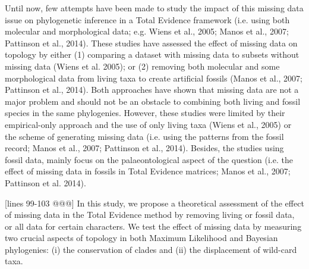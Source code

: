 \documentclass[12pt,letterpaper]{article}
\begin{document}
\begin{enumerate}
Until now, few attempts have been made to study the impact of this missing data issue on phylogenetic inference in a Total Evidence framework (i.e. using both molecular and morphological data; e.g. Wiens et al., 2005; Manos et al., 2007; Pattinson et al., 2014).
These studies have assessed the effect of missing data on topology by either (1) comparing a dataset with missing data to subsets without missing data (Wiens et al. 2005); or (2) removing both molecular and some morphological data from living taxa to create artificial fossils (Manos et al., 2007; Pattinson et al., 2014).
Both approaches have shown that missing data are not a major problem and should not be an obstacle to combining both living and fossil species in the same phylogenies.
However, these studies were limited by their empirical-only approach and the use of only living taxa (Wiens et al., 2005) or the scheme of generating missing data (i.e. using the patterns from the fossil record; Manos et al., 2007; Pattinson et al., 2014).
Besides, the studies using fossil data, mainly focus on the palaeontological aspect of the question (i.e. the effect of missing data in fossils in Total Evidence matrices; Manos et al., 2007; Pattinson et al. 2014).

[lines 99-103 @@@] In this study, we propose a theoretical assessment of the effect of missing data in the Total Evidence method by removing living or fossil data, or all data for certain characters.
We test the effect of missing data by measuring two crucial aspects of topology in both Maximum Likelihood and Bayesian phylogenies: (i) the conservation of clades and (ii) the displacement of wild-card taxa. 



\end{enumerate}
\end{document}
